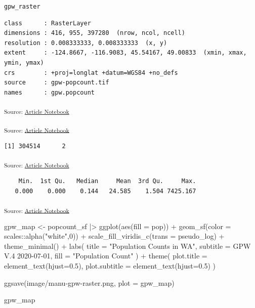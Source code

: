 \documentclass[
  letterpaper,
  DIV=11,
  numbers=noendperiod]{scrartcl}
\newenvironment{Shaded}{\begin{snugshade}}{\end{snugshade}}
\newcommand{\AttributeTok}[1]{\textcolor[rgb]{0.40,0.45,0.13}{#1}}
\newcommand{\DecValTok}[1]{\textcolor[rgb]{0.68,0.00,0.00}{#1}}
\newcommand{\FloatTok}[1]{\textcolor[rgb]{0.68,0.00,0.00}{#1}}
\newcommand{\FunctionTok}[1]{\textcolor[rgb]{0.28,0.35,0.67}{#1}}
\newcommand{\NormalTok}[1]{\textcolor[rgb]{0.00,0.23,0.31}{#1}}
\newcommand{\OtherTok}[1]{\textcolor[rgb]{0.00,0.23,0.31}{#1}}
\newcommand{\SpecialCharTok}[1]{\textcolor[rgb]{0.37,0.37,0.37}{#1}}
\newcommand{\StringTok}[1]{\textcolor[rgb]{0.13,0.47,0.30}{#1}}
\begin{document}
\texttt{gpw\_raster}

\begin{verbatim}
class      : RasterLayer 
dimensions : 416, 955, 397280  (nrow, ncol, ncell)
resolution : 0.008333333, 0.008333333  (x, y)
extent     : -124.8667, -116.9083, 45.54167, 49.00833  (xmin, xmax, ymin, ymax)
crs        : +proj=longlat +datum=WGS84 +no_defs 
source     : gpw-popcount.tif 
names      : gpw.popcount 
\end{verbatim}

\textsubscript{Source:
\href{https://h-christy.github.io/24-manuscript/index.qmd.html}{Article
Notebook}}

\textsubscript{Source:
\href{https://h-christy.github.io/24-manuscript/index.qmd.html}{Article
Notebook}}

\begin{verbatim}
[1] 304514      2
\end{verbatim}

\textsubscript{Source:
\href{https://h-christy.github.io/24-manuscript/index.qmd.html}{Article
Notebook}}

\begin{verbatim}
    Min.  1st Qu.   Median     Mean  3rd Qu.     Max. 
   0.000    0.000    0.144   24.585    1.504 7425.167 
\end{verbatim}

\textsubscript{Source:
\href{https://h-christy.github.io/24-manuscript/index.qmd.html}{Article
Notebook}}

\begin{Shaded}
\begin{Highlighting}[]
\NormalTok{gpw\_map }\OtherTok{\textless{}{-}}\NormalTok{ popcount\_sf }\SpecialCharTok{|\textgreater{}} \FunctionTok{ggplot}\NormalTok{(}\FunctionTok{aes}\NormalTok{(}\AttributeTok{fill =}\NormalTok{ pop)) }\SpecialCharTok{+}
  \FunctionTok{geom\_sf}\NormalTok{(}\AttributeTok{color =}\NormalTok{ scales}\SpecialCharTok{::}\FunctionTok{alpha}\NormalTok{(}\StringTok{"white"}\NormalTok{,}\DecValTok{0}\NormalTok{)) }\SpecialCharTok{+}
  \FunctionTok{scale\_fill\_viridis\_c}\NormalTok{(}\AttributeTok{trans =} \StringTok{\textquotesingle{}pseudo\_log\textquotesingle{}}\NormalTok{) }\SpecialCharTok{+} 
  \FunctionTok{theme\_minimal}\NormalTok{() }\SpecialCharTok{+}
  \FunctionTok{labs}\NormalTok{(}
    \AttributeTok{title =} \StringTok{"Population Counts in WA"}\NormalTok{,}
    \AttributeTok{subtitle =} \StringTok{\textquotesingle{}GPW V.4 2020{-}07{-}01\textquotesingle{}}\NormalTok{,}
    \AttributeTok{fill =} \StringTok{"Population Count"}
\NormalTok{    ) }\SpecialCharTok{+} 
  \FunctionTok{theme}\NormalTok{(}
    \AttributeTok{plot.title =} \FunctionTok{element\_text}\NormalTok{(}\AttributeTok{hjust=}\FloatTok{0.5}\NormalTok{),}
    \AttributeTok{plot.subtitle =} \FunctionTok{element\_text}\NormalTok{(}\AttributeTok{hjust=}\FloatTok{0.5}\NormalTok{)}
\NormalTok{    )}

\FunctionTok{ggsave}\NormalTok{(}\StringTok{\textquotesingle{}image/manu{-}gpw{-}raster.png\textquotesingle{}}\NormalTok{, }\AttributeTok{plot =}\NormalTok{ gpw\_map)}

\NormalTok{gpw\_map}
\end{Highlighting}
\end{Shaded}
\end{document}
